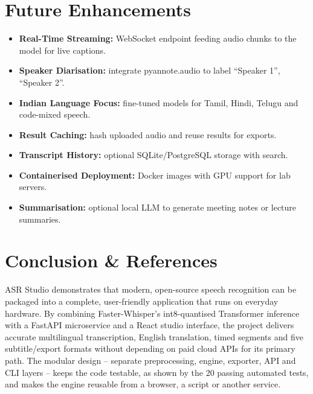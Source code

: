 \documentclass[11pt,a4paper]{article}
\begin{document}
\section{Future Enhancements}
\begin{itemize}[leftmargin=1.2em]
  \item \textbf{Real-Time Streaming:} WebSocket endpoint feeding audio chunks to the model for live captions.
  \item \textbf{Speaker Diarisation:} integrate pyannote.audio to label ``Speaker 1'', ``Speaker 2''.
  \item \textbf{Indian Language Focus:} fine-tuned models for Tamil, Hindi, Telugu and code-mixed speech.
  \item \textbf{Result Caching:} hash uploaded audio and reuse results for exports.
  \item \textbf{Transcript History:} optional SQLite/PostgreSQL storage with search.
  \item \textbf{Containerised Deployment:} Docker images with GPU support for lab servers.
  \item \textbf{Summarisation:} optional local LLM to generate meeting notes or lecture summaries.
\end{itemize}

\clearpage
\section{Conclusion \& References}
ASR Studio demonstrates that modern, open-source speech recognition can be packaged into a complete, user-friendly application that runs on everyday hardware. By combining Faster-Whisper's int8-quantised Transformer inference with a FastAPI microservice and a React studio interface, the project delivers accurate multilingual transcription, English translation, timed segments and five subtitle/export formats without depending on paid cloud APIs for its primary path. The modular design -- separate preprocessing, engine, exporter, API and CLI layers -- keeps the code testable, as shown by the 20 passing automated tests, and makes the engine reusable from a browser, a script or another service.
\end{document}
